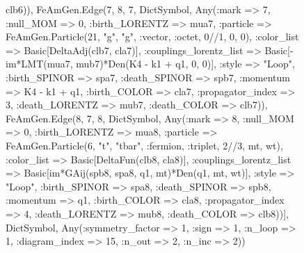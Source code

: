 \documentclass{revtex4}
\begin{document}
\begin{figure}[!htb]
\begin{center}
{clb6)), FeAmGen.Edge(7, 8, 7, Dict{Symbol, Any}(:mark => 7, :null_MOM => 0, :birth_LORENTZ => mua7, :particle => FeAmGen.Particle(21, "g", "g", :vector, :octet, 0//1, 0, 0), :color_list => Basic[DeltaAdj(clb7, cla7)], :couplings_lorentz_list => Basic[-im*LMT(mua7, mub7)*Den(K4 - k1 + q1, 0, 0)], :style => "Loop", :birth_SPINOR => spa7, :death_SPINOR => spb7, :momentum => K4 - k1 + q1, :birth_COLOR => cla7, :propagator_index => 3, :death_LORENTZ => mub7, :death_COLOR => clb7)), FeAmGen.Edge(8, 7, 8, Dict{Symbol, Any}(:mark => 8, :null_MOM => 0, :birth_LORENTZ => mua8, :particle => FeAmGen.Particle(6, "t", "tbar", :fermion, :triplet, 2//3, mt, wt), :color_list => Basic[DeltaFun(clb8, cla8)], :couplings_lorentz_list => Basic[im*GAij(spb8, spa8, q1, mt)*Den(q1, mt, wt)], :style => "Loop", :birth_SPINOR => spa8, :death_SPINOR => spb8, :momentum => q1, :birth_COLOR => cla8, :propagator_index => 4, :death_LORENTZ => mub8, :death_COLOR => clb8))], Dict{Symbol, Any}(:symmetry_factor => 1, :sign => 1, :n_loop => 1, :diagram_index => 15, :n_out => 2, :n_inc => 2)) 
}
\end{center}
\end{figure}
\end{document}
